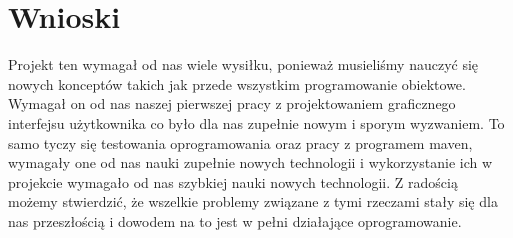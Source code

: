 \documentclass[10pt, a4paper]{report}
\begin{document}
\section{Wnioski}
Projekt ten wymagał od nas wiele wysiłku, ponieważ musieliśmy nauczyć się nowych konceptów takich jak przede wszystkim
programowanie obiektowe. Wymagał on od nas naszej pierwszej pracy z projektowaniem graficznego interfejsu użytkownika co było dla nas zupełnie nowym i sporym wyzwaniem.
To samo tyczy się testowania oprogramowania oraz pracy z programem maven, wymagały one od nas nauki zupełnie nowych technologii i wykorzystanie ich w projekcie wymagało od nas
szybkiej nauki nowych technologii. Z radością możemy stwierdzić, że wszelkie problemy związane z tymi rzeczami stały się dla nas przeszłością i dowodem na to jest w pełni działające
oprogramowanie.
\end{document}
